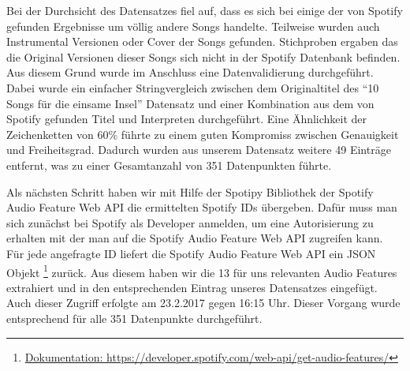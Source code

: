 Bei der Durchsicht des Datensatzes fiel auf, dass es sich bei einige der von Spotify gefunden Ergebnisse um völlig andere Songs handelte.
Teilweise wurden auch Instrumental Versionen oder Cover der Songs gefunden.
Stichproben ergaben das die Original Versionen dieser Songs sich nicht in der Spotify Datenbank befinden.
Aus diesem Grund wurde im Anschluss eine Datenvalidierung durchgeführt.
Dabei wurde ein einfacher Stringvergleich zwischen dem Originaltitel des "`10 Songs für die einsame Insel"' Datensatz und einer Kombination aus dem von Spotify gefunden Titel und Interpreten durchgeführt.
Eine Ähnlichkeit der Zeichenketten von 60\% führte zu einem guten Kompromiss zwischen Genauigkeit und Freiheitsgrad.
Dadurch wurden aus unserem Datensatz weitere 49 Einträge entfernt, was zu einer Gesamtanzahl von 351 Datenpunkten führte.

Als nächsten Schritt haben wir mit Hilfe der Spotipy Bibliothek der Spotify Audio Feature Web API die ermittelten Spotify IDs übergeben.
Dafür muss man sich zunächst bei Spotify als Developer anmelden, um eine Autorisierung zu erhalten mit der man auf die Spotify Audio Feature Web API zugreifen kann.
Für jede angefragte ID liefert die Spotify Audio Feature Web API ein JSON Objekt \footnote{\url{Dokumentation: https://developer.spotify.com/web-api/get-audio-features/}} zurück.
Aus diesem haben wir die 13 für uns relevanten Audio Features extrahiert und in den entsprechenden Eintrag unseres Datensatzes eingefügt.
Auch dieser Zugriff erfolgte am 23.2.2017 gegen 16:15 Uhr.
Dieser Vorgang wurde entsprechend für alle 351 Datenpunkte durchgeführt.

